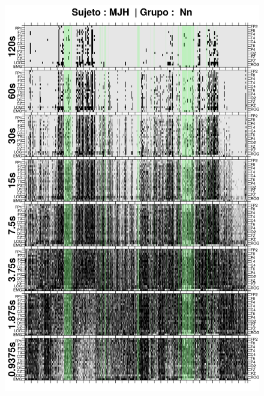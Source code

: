 \begin{figure}
\centering
\includegraphics[width=0.9\linewidth]
{./img_ejemplos/MJNNVIGILOS_comp_est_.png} 
\end{figure}

